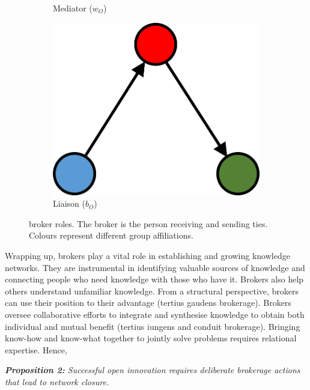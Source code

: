 \begin{figure}
\begin{subfigure}[b]{0.25\textwidth}
    \caption{Mediator ($w_O$)}
    \label{fig:4}
  \end{subfigure}
  \hspace{2em}
  \begin{subfigure}[b]{0.25\textwidth}
    \includegraphics[width=\textwidth]{Images/b_O.png}
    \caption{Liaison ($b_O$)}
    \label{fig:5}
  \end{subfigure}
  \caption[\citet{gould1989structures} broker roles]{\citet{gould1989structures} broker roles. The broker is the person receiving and sending ties. Colours represent different group affiliations.}%
    \label{fig:gf_roles}%
\end{figure}

Wrapping up, brokers play a vital role in establishing and growing knowledge networks. They are instrumental in identifying valuable sources of knowledge and connecting people who need knowledge with those who have it. Brokers also help others understand unfamiliar knowledge. From a structural perspective, brokers can use their position to their advantage (tertius gaudens brokerage). Brokers oversee collaborative efforts to integrate and synthesise knowledge to obtain both individual and mutual benefit (tertius iungens and conduit brokerage). Bringing know-how and know-what together to jointly solve problems requires relational expertise. Hence, \bigskip  

\begin{tcolorbox}
\textit{\textbf{Proposition 2:} Successful open innovation requires deliberate brokerage actions that lead to network closure.}
\end{tcolorbox}


